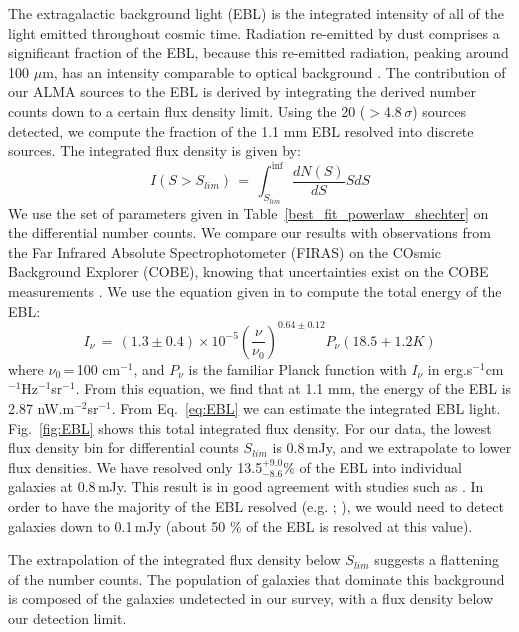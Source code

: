 \documentclass[longauth]{aa}
\begin{document}
The extragalactic background light (EBL) is the integrated intensity of all of the light emitted throughout cosmic time. Radiation re-emitted by dust comprises a significant fraction of the EBL, because this re-emitted radiation, peaking around 100 $\mu$m, has an intensity comparable to optical background \citep{Dole2006}. The contribution of our ALMA sources to the EBL is derived by integrating the derived number counts down to a certain flux density limit. Using the 20 ($>$4.8\,$\sigma$) sources detected, we compute the fraction of the 1.1 mm EBL resolved into discrete sources. The integrated flux density is given by:
\begin{equation}
\label{eq:EBL}
I(S>S_{lim})\,=\,\int_{S_{lim}}^{\inf}\frac{dN(S)}{dS}SdS
\end{equation}
We use the set of parameters given in Table~\ref{best_fit_powerlaw_shechter} on the differential number counts. We compare our results with observations from the Far Infrared Absolute Spectrophotometer (FIRAS) on the COsmic Background Explorer (COBE), knowing that uncertainties exist on the COBE measurements \citep[e.g.][]{Yamaguchi2016}. We use the equation given in \cite{Fixsen1998} to compute the total energy of the EBL:
\begin{equation}
I_\nu\,=\,(1.3\pm0.4)\times10^{-5}\left(\frac{\nu}{\nu_0}\right)^{0.64\pm0.12}P_\nu(18.5+1.2 K)
\end{equation}
\noindent where $\nu_0$\,=\,100 cm$^{-1}$, and $P_\nu$ is the familiar Planck function with $I_\nu$ in erg.s$^{-1}$cm$^{-1}$Hz$^{-1}$sr$^{-1}$.
From this equation, we find that at 1.1 mm, the energy of the EBL is 2.87 nW.m$^{-2}$sr$^{-1}$. 
From Eq.~\ref{eq:EBL} we can estimate the integrated EBL light. Fig.~\ref{fig:EBL} shows this total integrated flux density. For our data, the lowest flux density bin for differential counts $S_{lim}$ is 0.8\,mJy, and we extrapolate to lower flux densities. We have resolved only 13.5$_{-8.6}^{+9.0}$\% of the EBL into individual galaxies at 0.8\,mJy. This result is in good agreement with studies such as \cite{Fujimoto2016}. In order to have the majority of the EBL resolved (e.g. \mbox{\citealt{Hatsukade2013}}; \citealt{Ono2014, Carniani2015, Fujimoto2016}), we would need to detect galaxies down to 0.1\,mJy (about 50 \% of the EBL is resolved at this value).

The extrapolation of the integrated flux density below $S_{lim}$ suggests a flattening of the number counts. The population of galaxies that dominate this background is composed of the galaxies undetected in our survey, with a flux density below our detection limit. 
\end{document}
